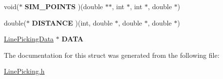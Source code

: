 \begin{DoxyCompactItemize}
\item 
\hypertarget{struct_line_picking_rec_a0a52fb5ad10a7894ccfea724e76d2b87}{void($\ast$ {\bfseries S\-I\-M\-\_\-\-P\-O\-I\-N\-T\-S} )(double $\ast$$\ast$, int $\ast$, int $\ast$, double $\ast$)}\label{struct_line_picking_rec_a0a52fb5ad10a7894ccfea724e76d2b87}

\item 
\hypertarget{struct_line_picking_rec_ac7fa55afba62f31918eed103153e582e}{double($\ast$ {\bfseries D\-I\-S\-T\-A\-N\-C\-E} )(int, double $\ast$, double $\ast$, double $\ast$)}\label{struct_line_picking_rec_ac7fa55afba62f31918eed103153e582e}

\item 
\hypertarget{struct_line_picking_rec_abe5b63d6b58ae9d52a9c7b827375641e}{\hyperlink{struct_line_picking_data}{Line\-Picking\-Data} $\ast$ {\bfseries D\-A\-T\-A}}\label{struct_line_picking_rec_abe5b63d6b58ae9d52a9c7b827375641e}

\end{DoxyCompactItemize}


The documentation for this struct was generated from the following file\-:\begin{DoxyCompactItemize}
\item 
\hyperlink{_line_picking_8h}{Line\-Picking.\-h}\end{DoxyCompactItemize}
